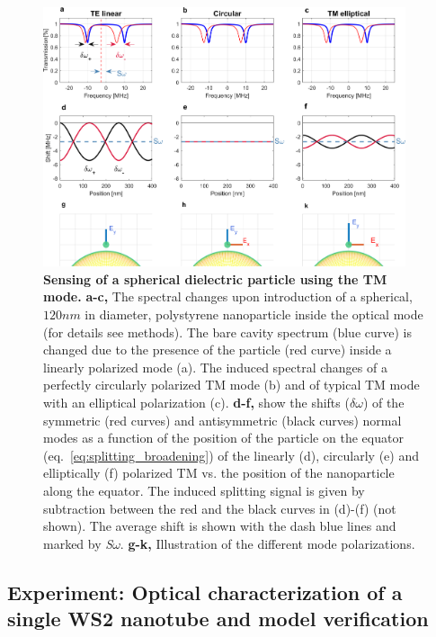 \documentclass[journal=jacsat,manuscript=article]{achemso}
\begin{document}
\begin{figure}[H]
\centering
                \includegraphics[trim=0.0cm 0.0cm 0.0cm 0.0cm, clip, width=0.95\textwidth]{Images/TMspherical_modified_3.png}\quad
             \caption{\textbf{Sensing of a spherical dielectric particle using the TM mode.} \textbf{a-c,} The spectral changes upon introduction of a spherical, $120nm$ in diameter, polystyrene nanoparticle inside the optical mode (for details see methods). The bare cavity spectrum (blue curve) is changed due to the presence of the particle (red curve) inside a linearly polarized mode (a). The induced spectral changes of a perfectly circularly polarized TM mode (b) and of typical TM mode with an elliptical polarization (c). \textbf{d-f,} show the shifts ($\delta \omega$) of the symmetric (red curves) and antisymmetric (black curves) normal modes as a function of the position of the particle on the equator (eq.~\ref{eq:splitting_broadening}) of the linearly (d), circularly (e) and elliptically (f) polarized TM vs. the position of the nanoparticle along the equator.  The induced splitting signal is given by subtraction between the red and the black curves in (d)-(f) (not shown). The average shift is shown with the dash blue lines and marked by \textit{S}$\omega$. \textbf{g-k,} Illustration of the different mode polarizations.
						\label{fig:TETMcompare}}
\end{figure}

\subsection{Experiment: Optical characterization of a single WS2 nanotube and model verification}
\end{document}

